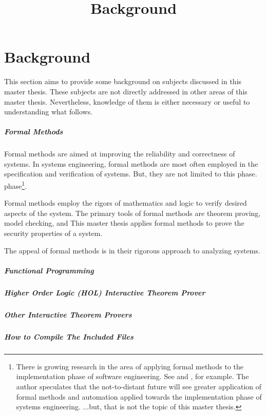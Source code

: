 \documentclass[../../main/main.tex]{subfiles}
\begin{document}
\title{Background}

\chapter{Background}
This section aims to provide some background on subjects discussed in this master thesis.  These subjects are not directly addressed in other areas of this master thesis.  Nevertheless, knowledge of them is either necessary or useful to understanding what follows.

\paragraph*{Formal Methods}
Formal methods are aimed at improving the reliability and correctness of systems\cite{formalmethodslcarke}.  In systems engineering, formal methods are most often employed in the specification and verification of systems.  But, they are not limited to this phase. phase\footnote{There is growing research in the area of applying formal methods to the implementation phase of software engineering.  See \cite{varvel} and \cite{modularC}, for example.  The author speculates that the not-to-distant future will see greater application of formal methods and automation applied towards the implementation phase of systems engineering.  ...but, that is not the topic of this master thesis.}.  

Formal methods employ the rigors of mathematics and logic to verify desired aspects of the system.  The primary tools of formal methods are theorem proving, model checking, and This master thesis applies formal methods to prove the security properties of a system. 

The appeal of formal methods is in their rigorous approach to analyzing systems.    

\paragraph*{Functional Programming}
\paragraph*{Higher Order Logic (HOL) Interactive Theorem Prover}
\paragraph*{Other Interactive Theorem Provers}
\paragraph*{How to Compile The Included Files}
\end{document}
